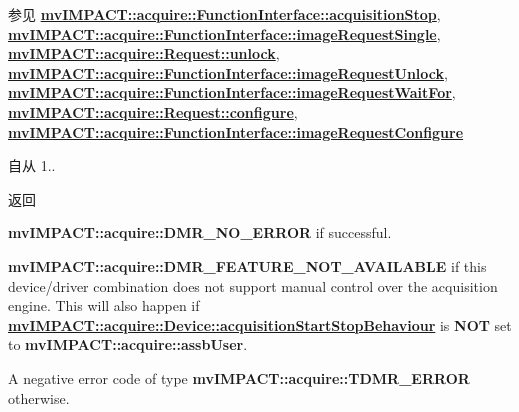\begin{DoxySeeAlso}{参见}
{\bfseries \hyperlink{classmv_i_m_p_a_c_t_1_1acquire_1_1_function_interface_ab52b63727aa33cb4cc2bdd0856c0f237}{mv\+I\+M\+P\+A\+C\+T\+::acquire\+::\+Function\+Interface\+::acquisition\+Stop}}, ~\newline
 {\bfseries \hyperlink{classmv_i_m_p_a_c_t_1_1acquire_1_1_function_interface_a59571120b5e81c3af596ea5da5dc63ba}{mv\+I\+M\+P\+A\+C\+T\+::acquire\+::\+Function\+Interface\+::image\+Request\+Single}}, ~\newline
 {\bfseries \hyperlink{classmv_i_m_p_a_c_t_1_1acquire_1_1_request_a3c30ced407d20caef49e3148257cd91e}{mv\+I\+M\+P\+A\+C\+T\+::acquire\+::\+Request\+::unlock}}, ~\newline
 {\bfseries \hyperlink{classmv_i_m_p_a_c_t_1_1acquire_1_1_function_interface_a378a338217d5a681e880a0d9395f1a62}{mv\+I\+M\+P\+A\+C\+T\+::acquire\+::\+Function\+Interface\+::image\+Request\+Unlock}}, ~\newline
 {\bfseries \hyperlink{classmv_i_m_p_a_c_t_1_1acquire_1_1_function_interface_a4cefdfda8e8940736ae9a4c97b6de8c9}{mv\+I\+M\+P\+A\+C\+T\+::acquire\+::\+Function\+Interface\+::image\+Request\+Wait\+For}}, ~\newline
 {\bfseries \hyperlink{classmv_i_m_p_a_c_t_1_1acquire_1_1_request_a5ad02aed16acd60699f3d8757c63af43}{mv\+I\+M\+P\+A\+C\+T\+::acquire\+::\+Request\+::configure}}, ~\newline
 {\bfseries \hyperlink{classmv_i_m_p_a_c_t_1_1acquire_1_1_function_interface_a05594ac5b54679152d27ac0e73b3908e}{mv\+I\+M\+P\+A\+C\+T\+::acquire\+::\+Function\+Interface\+::image\+Request\+Configure}} 
\end{DoxySeeAlso}
\begin{DoxySince}{自从}
1..
\end{DoxySince}
\begin{DoxyReturn}{返回}

\begin{DoxyItemize}
\item {\bfseries mv\+I\+M\+P\+A\+C\+T\+::acquire\+::\+D\+M\+R\+\_\+\+N\+O\+\_\+\+E\+R\+R\+O\+R} if successful.
\item {\bfseries mv\+I\+M\+P\+A\+C\+T\+::acquire\+::\+D\+M\+R\+\_\+\+F\+E\+A\+T\+U\+R\+E\+\_\+\+N\+O\+T\+\_\+\+A\+V\+A\+I\+L\+A\+B\+L\+E} if this device/driver combination does not support manual control over the acquisition engine. This will also happen if {\bfseries \hyperlink{classmv_i_m_p_a_c_t_1_1acquire_1_1_device_aa5cdb4615de973bbf1c24f2fd5a3d1b5}{mv\+I\+M\+P\+A\+C\+T\+::acquire\+::\+Device\+::acquisition\+Start\+Stop\+Behaviour}} is {\bfseries N\+O\+T} set to {\bfseries mv\+I\+M\+P\+A\+C\+T\+::acquire\+::assb\+User}.
\item A negative error code of type {\bfseries mv\+I\+M\+P\+A\+C\+T\+::acquire\+::\+T\+D\+M\+R\+\_\+\+E\+R\+R\+O\+R} otherwise. 
\end{DoxyItemize}
\end{DoxyReturn}
